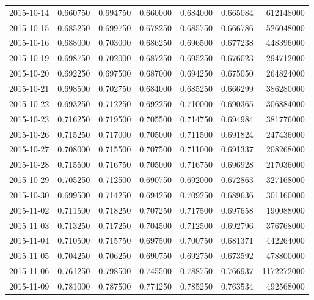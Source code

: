 \begin{tabular}{lrrrrrr}
2015-10-14 &    0.660750 &    0.694750 &    0.660000 &    0.684000 &    0.665084 &   612148000 \\
2015-10-15 &    0.685250 &    0.699750 &    0.678250 &    0.685750 &    0.666786 &   526048000 \\
2015-10-16 &    0.688000 &    0.703000 &    0.686250 &    0.696500 &    0.677238 &   448396000 \\
2015-10-19 &    0.698750 &    0.702000 &    0.687250 &    0.695250 &    0.676023 &   294712000 \\
2015-10-20 &    0.692250 &    0.697500 &    0.687000 &    0.694250 &    0.675050 &   264824000 \\
2015-10-21 &    0.698500 &    0.702750 &    0.684000 &    0.685250 &    0.666299 &   386280000 \\
2015-10-22 &    0.693250 &    0.712250 &    0.692250 &    0.710000 &    0.690365 &   306884000 \\
2015-10-23 &    0.716250 &    0.719500 &    0.705500 &    0.714750 &    0.694984 &   381776000 \\
2015-10-26 &    0.715250 &    0.717000 &    0.705000 &    0.711500 &    0.691824 &   247436000 \\
2015-10-27 &    0.708000 &    0.715500 &    0.707500 &    0.711000 &    0.691337 &   208268000 \\
2015-10-28 &    0.715500 &    0.716750 &    0.705000 &    0.716750 &    0.696928 &   217036000 \\
2015-10-29 &    0.705250 &    0.712500 &    0.690750 &    0.692000 &    0.672863 &   327168000 \\
2015-10-30 &    0.699500 &    0.714250 &    0.694250 &    0.709250 &    0.689636 &   301160000 \\
2015-11-02 &    0.711500 &    0.718250 &    0.707250 &    0.717500 &    0.697658 &   190088000 \\
2015-11-03 &    0.713250 &    0.717250 &    0.704500 &    0.712500 &    0.692796 &   376768000 \\
2015-11-04 &    0.710500 &    0.715750 &    0.697500 &    0.700750 &    0.681371 &   442264000 \\
2015-11-05 &    0.704250 &    0.706250 &    0.690750 &    0.692750 &    0.673592 &   478800000 \\
2015-11-06 &    0.761250 &    0.798500 &    0.745500 &    0.788750 &    0.766937 &  1172272000 \\
2015-11-09 &    0.781000 &    0.787500 &    0.774250 &    0.785250 &    0.763534 &   492568000 \\

\end{tabular}
